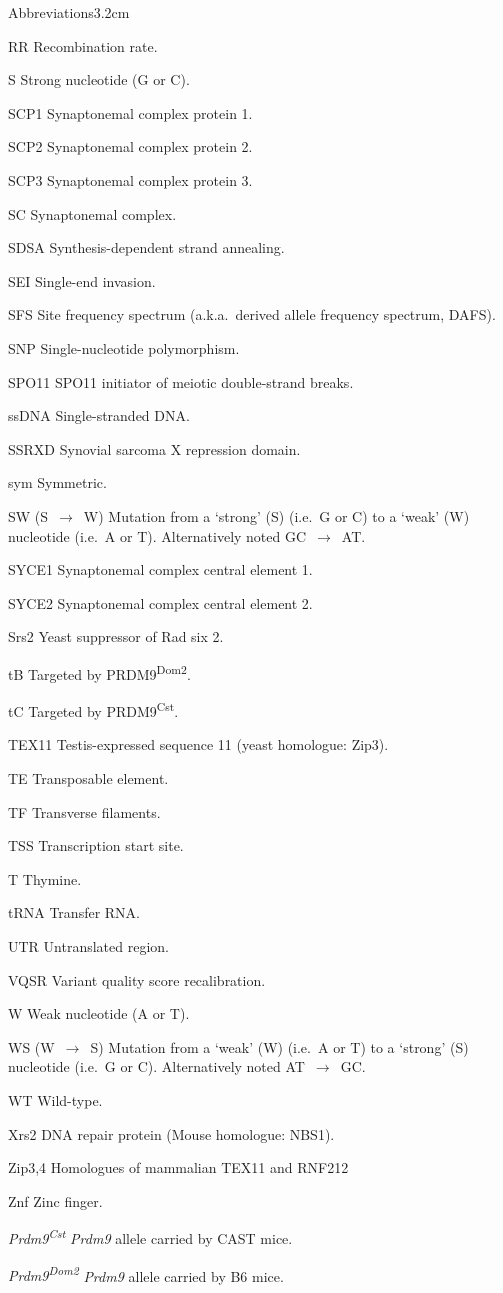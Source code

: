 \begin{mclistof}{Abbreviations}{3.2cm}
\item[RR] Recombination rate.
\item[S] Strong nucleotide (G or C).
\item[SCP1] Synaptonemal complex protein 1.
\item[SCP2] Synaptonemal complex protein 2.
\item[SCP3] Synaptonemal complex protein 3.
\item[SC] Synaptonemal complex.
\item[SDSA] Synthesis-dependent strand annealing.
\item[SEI] Single-end invasion.
\item[SFS] Site frequency spectrum (a.k.a.\ derived allele frequency spectrum, DAFS).
\item[SNP] Single-nucleotide polymorphism.
\item[SPO11] SPO11 initiator of meiotic double-strand breaks.
\item[ssDNA] Single-stranded DNA\@.
\item[SSRXD] Synovial sarcoma X repression domain.
\item[sym] Symmetric.
\item[SW (S~$\rightarrow$~W)] Mutation from a ‘strong’ (S) (i.e.\ G or C) to a ‘weak’ (W) nucleotide (i.e.\ A or T). Alternatively noted GC~$\rightarrow$~AT\@.
\item[SYCE1] Synaptonemal complex central element 1.
\item[SYCE2] Synaptonemal complex central element 2.
\item[Srs2] Yeast suppressor of Rad six 2.
\item[tB] Targeted by PRDM9\textsuperscript{Dom2}.
\item[tC] Targeted by PRDM9\textsuperscript{Cst}.
\item[TEX11] Testis-expressed sequence 11 (yeast homologue: Zip3).
\item[TE] Transposable element.
\item[TF] Transverse filaments.
\item[TSS] Transcription start site.
\item[T] Thymine.
\item[tRNA] Transfer RNA\@.
\item[UTR] Untranslated region.
\item[VQSR] Variant quality score recalibration.
\item[W] Weak nucleotide (A or T).
\item[WS (W~$\rightarrow$~S)] Mutation from a ‘weak’ (W) (i.e.\ A or T) to a ‘strong’ (S) nucleotide (i.e.\ G or C). Alternatively noted AT~$\rightarrow$~GC\@.
\item[WT] Wild-type.
\item[Xrs2] DNA repair protein (Mouse homologue: NBS1).
\item[Zip3,4] Homologues of mammalian TEX11 and RNF212
\item[Znf] Zinc finger.
\item[\textit{Prdm9\textsuperscript{Cst}}] \textit{Prdm9} allele carried by CAST mice.
\item[\textit{Prdm9\textsuperscript{Dom2}}] \textit{Prdm9} allele carried by B6 mice.


\end{mclistof}
